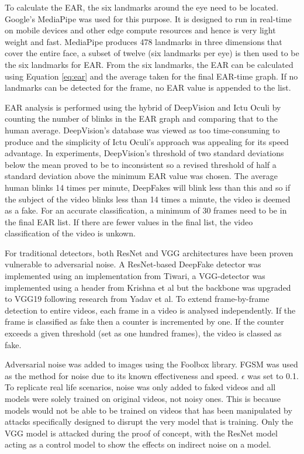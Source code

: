 To calculate the EAR, the six landmarks around the eye need to be located. Google's MediaPipe\cite{lugaresi2019mediapipe} was used for this purpose. It is designed to run in real-time on mobile devices and other edge compute resources and hence is very light weight and fast. MediaPipe produces 478 landmarks in three dimensions that cover the entire face, a subset of twelve (six landmarks per eye) is then used to be the six landmarks for EAR. From the six landmarks, the EAR can be calculated using Equation \ref{eq:ear} and the average taken for the final EAR-time graph. If no landmarks can be detected for the frame, no EAR value is appended to the list. 

EAR analysis is performed using the hybrid of DeepVision\cite{jung2020deepvision} and Ictu Oculi\cite{li2018ictu} by counting the number of blinks in the EAR graph and comparing that to the human average. DeepVision's database was viewed as too time-consuming to produce and the simplicity of Ictu Oculi's approach was appealing for its speed advantage. In experiments, DeepVision's threshold of two standard deviations below the mean proved to be to inconsistent so a revised threshold of half a standard deviation above the minimum EAR value was chosen. The average human blinks 14 times per minute\cite{schiffman1990sensation}, DeepFakes will blink less than this and so if the subject of the video blinks less than 14 times a minute, the video is deemed as a fake. For an accurate classification, a minimum of 30 frames need to be in the final EAR list. If there are fewer values in the final list, the video classification of the video is unkown.

For traditional detectors, both ResNet and VGG architectures have been proven vulnerable to adversarial noise\cite{gandhi2020adversarial}. A ResNet-based DeepFake detector was implemented using an implementation from Tiwari\cite{tiwari2024deepfake}, a VGG-detector was implemented using a header from Krishna et al\cite{krishna2022deepfake} but the backbone was upgraded to VGG19 following research from Yadav et al\cite{yadav2024deepfake}. To extend frame-by-frame detection to entire videos, each frame in a video is analysed independently. If the frame is classified as fake then a counter is incremented by one. If the counter exceeds a given threshold (set as one hundred frames), the video is classed as fake.

Adversarial noise was added to images using the Foolbox library\cite{rauber2017foolbox}\cite{rauber2017foolboxnative}. FGSM was used as the method for noise due to its known effectiveness and speed\cite{gandhi2020adversarial}. $\epsilon$ was set to 0.1. To replicate real life scenarios, noise was only added to faked videos and all models were solely trained on original videos, not noisy ones. This is because models would not be able to be trained on videos that has been manipulated by attacks specifically designed to disrupt the very model that is training. Only the VGG model is attacked during the proof of concept, with the ResNet model acting as a control model to show the effects on indirect noise on a model.

